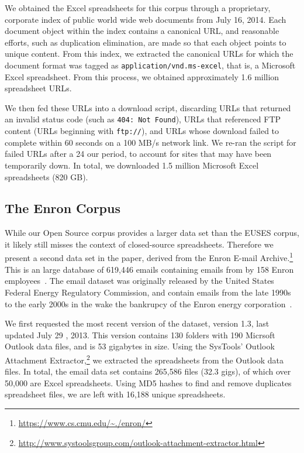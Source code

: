 \documentclass[conference]{IEEEtran}
\begin{document}

We obtained the Excel spreadsheets for this corpus through a proprietary, corporate index of public world wide web documents from July 16, 2014. 
%
Each document object within the index contains a canonical URL, and reasonable efforts, such as duplication elimination, are made so that each object points to unique content. 
%
From this index, we extracted the canonical URLs for which the document format was tagged as \texttt{application/vnd.ms-excel}, that is, a Microsoft Excel spreadsheet. 
%
From this process, we obtained approximately 1.6 million spreadsheet URLs.

We then fed these URLs into a download script, discarding URLs that returned an invalid status code (such as \texttt{404: Not Found}), URLs that referenced FTP content (URLs beginning with \texttt{ftp://}), and URLs whose download failed to complete within 60 seconds on a 100 MB/s network link. 
%
We re-ran the script for failed URLs after a 24 our period, to account for sites that may have been temporarily down. 
%
In total, we downloaded 1.5 million Microsoft Excel spreadsheets (820 GB). 


\subsection{The Enron Corpus}

While our Open Source corpus provides a larger data set than the EUSES corpus, 
it likely still misses the context of closed-source spreadsheets. 
Therefore we present a second data set in the paper, derived from
the Enron E-mail Archive.\footnote{\url{https://www.cs.cmu.edu/~./enron/}} 
This is an large database of 619,446 emails
containing emails from by 158 Enron employees~\cite{klimt2004introducing}.
The email dataset was originally released by the United States 
Federal Energy Regulatory Commission, and contain emails from the 
late 1990s to the early 2000s in the wake the bankrupcy of the Enron
energy corporation~\cite{grieve}.

We first requested the most recent version of the dataset, 
version 1.3, last updated July 29 , 2013. This version contains 130
folders with 190 Micrsoft Outlook data files, and is 53 gigabytes in size.
Using the SysTools' Outlook Attachment 
Extractor,\footnote{\url{http://www.systoolsgroup.com/outlook-attachment-extractor.html}} 
we extracted the spreadsheets from the Outlook data files. 
In total, the email data set
contains 265,586 files (32.3 gigs), of which over 50,000 are Excel spreadsheets. 
Using MD5 hashes to find and remove duplicates spreadsheet files,
we are left with 16,188 unique spreadsheets.
\end{document}
